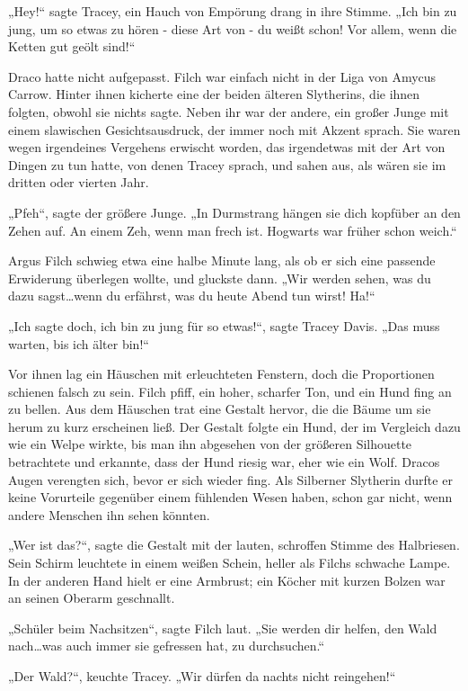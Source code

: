 {„Hey!“ sagte Tracey, ein Hauch von Empörung drang in ihre Stimme. „Ich bin zu jung, um so etwas zu hören - diese Art von - du weißt schon! Vor allem, wenn die Ketten gut geölt sind!“

Draco hatte nicht aufgepasst. Filch war einfach nicht in der Liga von Amycus Carrow. Hinter ihnen kicherte eine der beiden älteren Slytherins, die ihnen folgten, obwohl sie nichts sagte. Neben ihr war der andere, ein großer Junge mit einem slawischen Gesichtsausdruck, der immer noch mit Akzent sprach. Sie waren wegen irgendeines Vergehens erwischt worden, das irgendetwas mit der Art von Dingen zu tun hatte, von denen Tracey sprach, und sahen aus, als wären sie im dritten oder vierten Jahr.

„Pfeh“, sagte der größere Junge. „In Durmstrang hängen sie dich kopfüber an den Zehen auf. An einem Zeh, wenn man frech ist. Hogwarts war früher schon weich.“

Argus Filch schwieg etwa eine halbe Minute lang, als ob er sich eine passende Erwiderung überlegen wollte, und gluckste dann. „Wir werden sehen, was du dazu sagst…wenn du erfährst, was du heute Abend tun wirst! Ha!“

„Ich sagte doch, ich bin zu jung für so etwas!“, sagte Tracey Davis. „Das muss warten, bis ich älter bin!“

Vor ihnen lag ein Häuschen mit erleuchteten Fenstern, doch die Proportionen schienen falsch zu sein. Filch pfiff, ein hoher, scharfer Ton, und ein Hund fing an zu bellen. Aus dem Häuschen trat eine Gestalt hervor, die die Bäume um sie herum zu kurz erscheinen ließ. Der Gestalt folgte ein Hund, der im Vergleich dazu wie ein Welpe wirkte, bis man ihn abgesehen von der größeren Silhouette betrachtete und erkannte, dass der Hund riesig war, eher wie ein Wolf. Dracos Augen verengten sich, bevor er sich wieder fing. Als Silberner Slytherin durfte er keine Vorurteile gegenüber einem fühlenden Wesen haben, schon gar nicht, wenn andere Menschen ihn sehen könnten.

„Wer ist das?“, sagte die Gestalt mit der lauten, schroffen Stimme des Halbriesen. Sein Schirm leuchtete in einem weißen Schein, heller als Filchs schwache Lampe. In der anderen Hand hielt er eine Armbrust; ein Köcher mit kurzen Bolzen war an seinen Oberarm geschnallt.

„Schüler beim Nachsitzen“, sagte Filch laut. „Sie werden dir helfen, den Wald nach…was auch immer sie gefressen hat, zu durchsuchen.“

„Der Wald?“, keuchte Tracey. „Wir dürfen da nachts nicht reingehen!“

}
